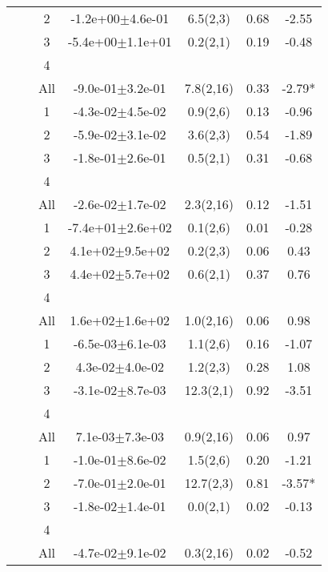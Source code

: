 \begin{longtable}{llccccS[table-format=-2.2, table-space-text-post = {***}]}
   &  & 2 & -1.2e+00$\pm$4.6e-01 & 6.5(2,3) & 0.68 & -2.55 \\ 
   &  & 3 & -5.4e+00$\pm$1.1e+01 & 0.2(2,1) & 0.19 & -0.48 \\ 
   &  & 4 &  &  &  &  \\ 
   &  & All & -9.0e-01$\pm$3.2e-01 & 7.8(2,16) & 0.33 & -2.79* \\ 
   \midrule
{} & {} & 1 & -4.3e-02$\pm$4.5e-02 & 0.9(2,6) & 0.13 & -0.96 \\ 
   &  & 2 & -5.9e-02$\pm$3.1e-02 & 3.6(2,3) & 0.54 & -1.89 \\ 
   &  & 3 & -1.8e-01$\pm$2.6e-01 & 0.5(2,1) & 0.31 & -0.68 \\ 
   &  & 4 &  &  &  &  \\ 
   &  & All & -2.6e-02$\pm$1.7e-02 & 2.3(2,16) & 0.12 & -1.51 \\ 
   \midrule
{} & {} & 1 & -7.4e+01$\pm$2.6e+02 & 0.1(2,6) & 0.01 & -0.28 \\ 
   &  & 2 &  4.1e+02$\pm$9.5e+02 & 0.2(2,3) & 0.06 & 0.43 \\ 
   &  & 3 &  4.4e+02$\pm$5.7e+02 & 0.6(2,1) & 0.37 & 0.76 \\ 
   &  & 4 &  &  &  &  \\ 
   &  & All &  1.6e+02$\pm$1.6e+02 & 1.0(2,16) & 0.06 & 0.98 \\ 
   \midrule
{} & {} & 1 & -6.5e-03$\pm$6.1e-03 & 1.1(2,6) & 0.16 & -1.07 \\ 
   &  & 2 &  4.3e-02$\pm$4.0e-02 & 1.2(2,3) & 0.28 & 1.08 \\ 
   &  & 3 & -3.1e-02$\pm$8.7e-03 & 12.3(2,1) & 0.92 & -3.51 \\ 
   &  & 4 &  &  &  &  \\ 
   &  & All &  7.1e-03$\pm$7.3e-03 & 0.9(2,16) & 0.06 & 0.97 \\ 
   \midrule
{} & {} & 1 & -1.0e-01$\pm$8.6e-02 & 1.5(2,6) & 0.20 & -1.21 \\ 
   &  & 2 & -7.0e-01$\pm$2.0e-01 & 12.7(2,3) & 0.81 & -3.57* \\ 
   &  & 3 & -1.8e-02$\pm$1.4e-01 & 0.0(2,1) & 0.02 & -0.13 \\ 
   &  & 4 &  &  &  &  \\ 
   &  & All & -4.7e-02$\pm$9.1e-02 & 0.3(2,16) & 0.02 & -0.52 \\ 

\end{longtable}
